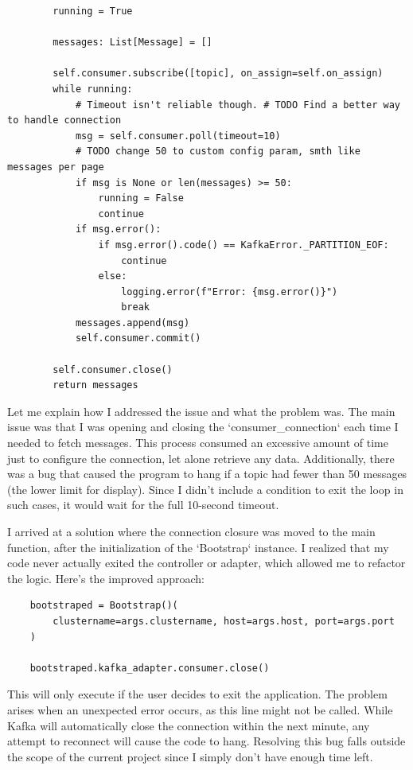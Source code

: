 \documentclass[10pt , a4paper]{report}
\newenvironment{code}{\captionsetup{type=listing}}{}
\begin{document}
\begin{code}
\begin{verbatim}
        running = True

        messages: List[Message] = []

        self.consumer.subscribe([topic], on_assign=self.on_assign)
        while running:
            # Timeout isn't reliable though. # TODO Find a better way to handle connection
            msg = self.consumer.poll(timeout=10)
            # TODO change 50 to custom config param, smth like messages per page
            if msg is None or len(messages) >= 50:
                running = False
                continue
            if msg.error():
                if msg.error().code() == KafkaError._PARTITION_EOF:
                    continue
                else:
                    logging.error(f"Error: {msg.error()}")
                    break
            messages.append(msg)
            self.consumer.commit()

        self.consumer.close()
        return messages
  \end{verbatim}
\end{code}

Let me explain how I addressed the issue and what the problem was. The main issue was that I was opening and closing the `consumer\_connection` each time I needed to fetch messages. This process consumed an excessive amount of time just to configure the connection, let alone retrieve any data. Additionally, there was a bug that caused the program to hang if a topic had fewer than 50 messages (the lower limit for display). Since I didn’t include a condition to exit the loop in such cases, it would wait for the full 10-second timeout.

I arrived at a solution where the connection closure was moved to the main function, after the initialization of the `Bootstrap` instance. I realized that my code never actually exited the controller or adapter, which allowed me to refactor the logic. Here’s the improved approach:

\begin{code}
  \begin{verbatim}
    bootstraped = Bootstrap()(
        clustername=args.clustername, host=args.host, port=args.port
    )

    bootstraped.kafka_adapter.consumer.close()
  \end{verbatim}
\end{code}

This will only execute if the user decides to exit the application. The problem arises when an unexpected error occurs, as this line might not be called. While Kafka will automatically close the connection within the next minute, any attempt to reconnect will cause the code to hang. Resolving this bug falls outside the scope of the current project since I simply don’t have enough time left.
\end{document}

